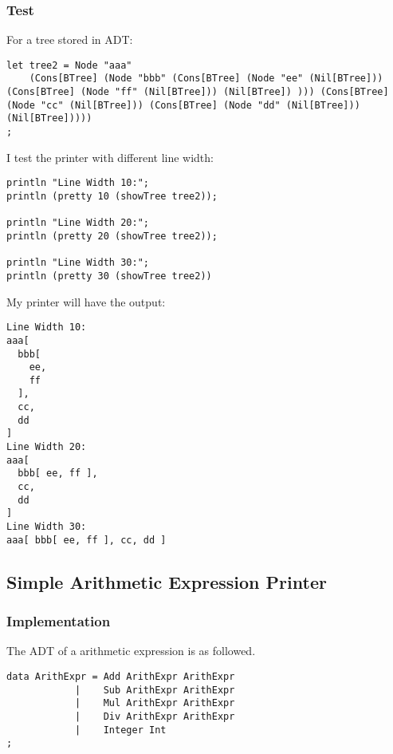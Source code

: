 \subsubsection{Test}

For a tree stored in ADT:
\begin{lstlisting}
let tree2 = Node "aaa"
    (Cons[BTree] (Node "bbb" (Cons[BTree] (Node "ee" (Nil[BTree])) (Cons[BTree] (Node "ff" (Nil[BTree])) (Nil[BTree]) ))) (Cons[BTree] (Node "cc" (Nil[BTree])) (Cons[BTree] (Node "dd" (Nil[BTree])) (Nil[BTree]))))
;
\end{lstlisting}

I test the printer with different line width:
\begin{lstlisting}
println "Line Width 10:";
println (pretty 10 (showTree tree2));

println "Line Width 20:";
println (pretty 20 (showTree tree2));

println "Line Width 30:";
println (pretty 30 (showTree tree2))
\end{lstlisting}

My printer will have the output:
\begin{lstlisting}
Line Width 10:
aaa[
  bbb[
    ee,
    ff
  ],
  cc,
  dd
]
Line Width 20:
aaa[
  bbb[ ee, ff ],
  cc,
  dd
]
Line Width 30:
aaa[ bbb[ ee, ff ], cc, dd ]
\end{lstlisting}

\subsection{Simple Arithmetic Expression Printer}

\subsubsection{Implementation}
The ADT of a arithmetic expression is as followed.
\begin{lstlisting}
data ArithExpr = Add ArithExpr ArithExpr
            |    Sub ArithExpr ArithExpr
            |    Mul ArithExpr ArithExpr
            |    Div ArithExpr ArithExpr
            |    Integer Int
;
\end{lstlisting}

